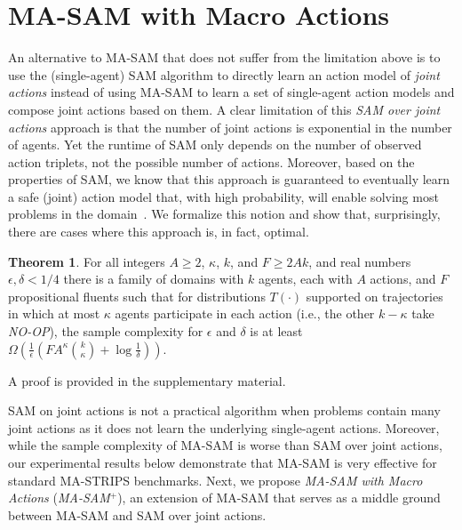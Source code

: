 \documentclass[letterpaper]{article} %
\theoremstyle{definition}
\newtheorem{theorem}{Theorem}
\theoremstyle{remark}
\newcommand{\noop}{\textit{NO-OP}\xspace}
\newcommand{\sam}{\ac{SAM}\xspace}
\newcommand{\masam}{\ac{MA-SAM}\xspace}
\newcommand{\cmasam}{\textit{MA-SAM\ensuremath{^+}}\xspace}
\begin{document}
\section{MA-SAM with Macro Actions}\label{sec:macrosam}
An alternative to \masam that does not suffer from the limitation above is to use the (single-agent) \sam algorithm
to directly learn an action model of \emph{joint actions} instead of using \masam to learn a set of single-agent action models and compose joint actions based on them.
A clear limitation of this \emph{\sam over joint actions} approach is that the number of joint actions is exponential in the number of agents.
Yet the runtime of \sam only depends on the number of observed action triplets, not the possible number of actions. Moreover, based on the properties of \sam, we know that this approach is guaranteed to eventually learn a safe (joint) action model that, with high probability, will enable solving most problems in the domain~\cite{juba2021safe}.
We formalize this notion and show that, surprisingly, there are cases where this approach is, in fact, optimal.


\begin{theorem}
For all integers $A\geq 2$, $\kappa$, $k$, and $F\geq 2Ak$, and real numbers $\epsilon,\delta < 1/4$ there is a family of domains with $k$ agents, each with $A$ actions, and $F$ propositional fluents such that for distributions $T(\cdot)$ supported on trajectories in which at most $\kappa$ agents participate in each action (i.e., the other $k-\kappa$ take \noop), the sample complexity for $\epsilon$ and $\delta$ is at least $\Omega\left(\frac{1}{\epsilon}(FA^{\kappa}{k\choose\kappa}+\log\frac{1}{\delta})\right)$.
\end{theorem}
\noindent A proof is provided in the supplementary material.

\sam on joint actions is not a practical algorithm when problems contain many joint actions as it does not learn the underlying single-agent actions.
Moreover, while the sample complexity of \masam is worse than \sam over joint actions, our experimental results below demonstrate that \masam is very effective for standard MA-STRIPS benchmarks.
Next, we propose \emph{\masam with Macro Actions} (\cmasam), an extension of \masam that serves as a middle ground between \masam and \sam over joint actions.
\end{document}
